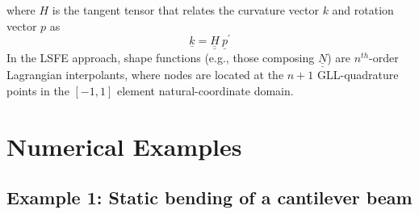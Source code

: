 \documentclass{aiaa-tc}
\newcommand{\tens}[1]{\underline{\underline{#1}}}
\renewcommand{\vec}[1]{\underline{#1}}
\begin{document}
where $H$ is the tangent tensor that relates the curvature vector $k$ and rotation vector $p$ as
\begin{equation}
    \label{Tensor}
    \vec{k} = \tens{H}~ \vec{p}^\prime
\end{equation}
In the LSFE approach, shape functions (e.g., those composing $\tens{N}$) are
$n^{th}$-order Lagrangian interpolants, where nodes are located at the $n+1$
GLL-quadrature points in the $[-1,1]$ element natural-coordinate domain.

\section{Numerical Examples}

\subsection{Example 1: Static bending of a cantilever beam}
\end{document}
